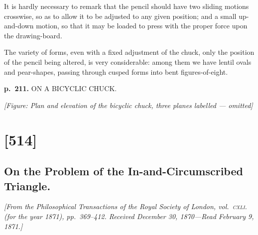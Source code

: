 \documentclass[11pt,a4paper]{book}
\begin{document}
It is hardly necessary to remark that the pencil should have two sliding motions
crosswise, so as to allow it to be adjusted to any given position; and a small
up-and-down motion, so that it may be loaded to press with the proper force upon
the drawing-board.

The variety of forms, even with a fixed adjustment of the chuck, only the position
of the pencil being altered, is very considerable: among them we have lentil ovals and
pear-shapes, passing through cusped forms into bent figures-of-eight.

\clearpage

\noindent
\textbf{p.~211.}  ON A BICYCLIC CHUCK.

\begin{center}
\textit{[Figure: Plan and elevation of the bicyclic chuck, three planes labelled --- omitted]}
\end{center}

\clearpage

\section{[514]}
\subsection{On the Problem of the In-and-Circumscribed Triangle.}

\begin{center}
\textit{[From the Philosophical Transactions of the Royal Society of London, vol.\ \textsc{cxli.} (for the
year 1871), pp.\ 369--412.  Received December 30, 1870---Read February 9, 1871.]}
\end{center}
\end{document}
